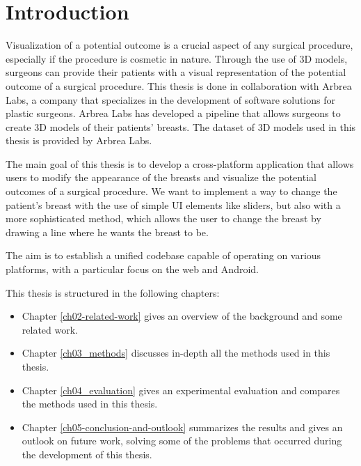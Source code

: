 \setcounter{chapter}{0}

\chapter{Introduction}

Visualization of a potential outcome is a crucial aspect of any surgical procedure, especially if the procedure is cosmetic in nature. Through the use of 3D models, surgeons can
provide their patients with a visual representation of the potential outcome of a surgical procedure. This thesis is done in collaboration with Arbrea Labs, a company that specializes in the development of
software solutions for plastic surgeons. Arbrea Labs has developed a pipeline that allows surgeons to create 3D models of their patients' breasts. The dataset of 3D models used in this thesis is
provided by Arbrea Labs.

The main goal of this thesis is to develop a cross-platform application that allows users to modify the appearance of the breasts and visualize the potential outcomes of a surgical procedure. We want to implement
a way to change the patient's breast with the use of simple UI elements like sliders, but also with a more sophisticated method, which allows the user to change the breast by drawing a line where he wants the breast to be.

The aim is to establish a unified codebase capable of operating on various platforms, with a particular focus on the web and Android.

This thesis is structured in the following chapters:
\begin{itemize}
    \item Chapter \ref{ch02-related-work} gives an overview of the background and some related work.
    \item Chapter \ref{ch03_methods} discusses in-depth all the methods used in this thesis.
    \item Chapter \ref{ch04_evaluation} gives an experimental evaluation and compares the methods used in this thesis.
    \item Chapter \ref{ch05-conclusion-and-outlook} summarizes the results and gives an outlook on future work, solving some of the problems that occurred during the development of this thesis.
\end{itemize}

